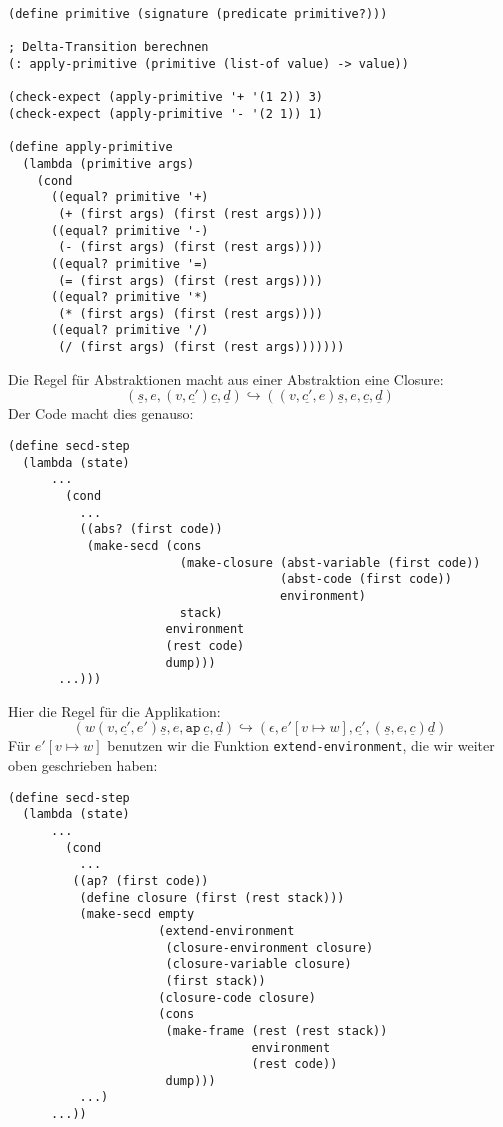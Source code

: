 \begin{lstlisting}
(define primitive (signature (predicate primitive?)))

; Delta-Transition berechnen
(: apply-primitive (primitive (list-of value) -> value))

(check-expect (apply-primitive '+ '(1 2)) 3)
(check-expect (apply-primitive '- '(2 1)) 1)

(define apply-primitive
  (lambda (primitive args)
    (cond
      ((equal? primitive '+)
       (+ (first args) (first (rest args))))
      ((equal? primitive '-)
       (- (first args) (first (rest args))))
      ((equal? primitive '=)
       (= (first args) (first (rest args))))
      ((equal? primitive '*)
       (* (first args) (first (rest args))))
      ((equal? primitive '/)
       (/ (first args) (first (rest args)))))))
\end{lstlisting}
%
Die Regel für Abstraktionen macht aus einer Abstraktion eine Closure:
\begin{displaymath}
  (\underline{s}, e, (v, \underline{c'}) \underline{c}, \underline{d})
  \hookrightarrow
  ((v, \underline{c'}, e) \underline{s}, e, \underline{c}, \underline{d})
\end{displaymath}
%
Der Code macht dies genauso:
%
\begin{lstlisting}
(define secd-step
  (lambda (state)
      ...
        (cond
          ...
          ((abs? (first code))
           (make-secd (cons
                        (make-closure (abst-variable (first code))
                                      (abst-code (first code))
                                      environment)
                        stack)
                      environment
                      (rest code)
                      dump)))
       ...)))
\end{lstlisting}
%
Hier die Regel für die Applikation:
%
\begin{displaymath}
  (w (v,\underline{c'}, e') \underline{s}, e, \mathtt{ap}~\underline{c}, \underline{d})
  \hookrightarrow
  (\epsilon, e'[v\mapsto w], \underline{c'}, (\underline{s}, e, \underline{c}) \underline{d})
\end{displaymath}
%
Für $e'[v\mapsto w]$ benutzen wir die Funktion
\lstinline{extend-environment}, die wir weiter oben geschrieben haben:
%
\begin{lstlisting}
(define secd-step
  (lambda (state)
      ...
        (cond
          ...
         ((ap? (first code))
          (define closure (first (rest stack)))
          (make-secd empty  
                     (extend-environment
                      (closure-environment closure)
                      (closure-variable closure)
                      (first stack))
                     (closure-code closure)
                     (cons
                      (make-frame (rest (rest stack)) 
                                  environment
                                  (rest code))
                      dump)))
          ...)
      ...))
\end{lstlisting}
